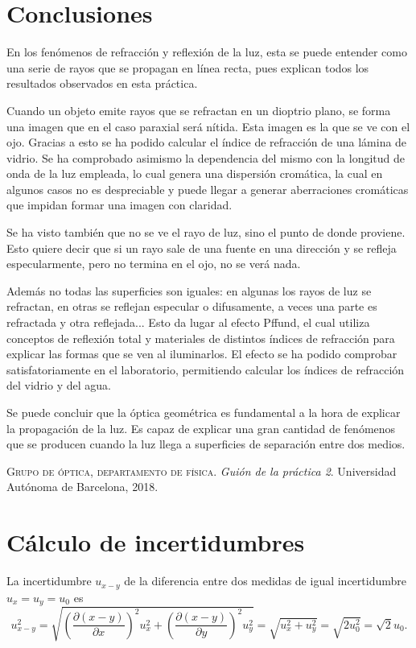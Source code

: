 \documentclass[12pt]{article}
\numberwithin{table}{section}
\numberwithin{figure}{section}
\numberwithin{equation}{section}
\begin{document}
\section{Conclusiones}
En los fenómenos de refracción y reflexión de la luz, esta se puede entender como una serie de rayos que se propagan en línea recta, pues explican todos los resultados observados en esta práctica.

Cuando un objeto emite rayos que se refractan en un dioptrio plano, se forma una imagen que en el caso paraxial será nítida. Esta imagen es la que se ve con el ojo. Gracias a esto se ha podido calcular el índice de refracción de una lámina de vidrio. Se ha comprobado asimismo la dependencia del mismo con la longitud de onda de la luz empleada, lo cual genera una dispersión cromática, la cual en algunos casos no es despreciable y puede llegar a generar aberraciones cromáticas que impidan formar una imagen con claridad.

Se ha visto también que no se ve el rayo de luz, sino el punto de donde proviene. Esto quiere decir que si un rayo sale de una fuente en una dirección y se refleja especularmente, pero no termina en el ojo, no se verá nada.

Además no todas las superficies son iguales: en algunas los rayos de luz se refractan, en otras se reflejan especular o difusamente, a veces una parte es refractada y otra reflejada... Esto da lugar al efecto Pffund, el cual utiliza conceptos de reflexión total y materiales de distintos índices de refracción para explicar las formas que se ven al iluminarlos. El efecto se ha podido comprobar satisfatoriamente en el laboratorio, permitiendo calcular los índices de refracción del vidrio y del agua.

Se puede concluir que la óptica geométrica es fundamental a la hora de explicar la propagación de la luz. Es capaz de explicar una gran cantidad de fenómenos que se producen cuando la luz llega a superficies de separación entre dos medios.

\begin{thebibliography}{1}
 \textsc{Grupo de óptica, departamento de física.} \textit{Guión de la práctica 2}. Universidad Autónoma de Barcelona, 2018.
\end{thebibliography}
\newpage

\appendix
\section{Cálculo de incertidumbres}
La incertidumbre $u_{x-y}$ de la diferencia entre dos medidas de igual incertidumbre $u_x=u_y=u_0$ es
\begin{equation}\label{P2incdif}
u_{x-y}^2=\sqrt{\left(\frac{\partial(x-y)}{\partial x}\right)^2u_x^2+\left(\frac{\partial(x-y)}{\partial y}\right)^2u_y^2}=\sqrt{u_x^2+u_y^2}=\sqrt{2u_0^2}=\sqrt{2}u_0.
\end{equation}
\end{document}
